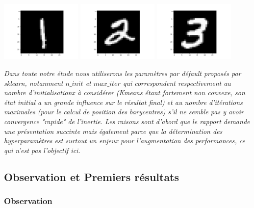 \documentclass{article}
\begin{document}
\begin{center}
  \includegraphics[width=0.3\textwidth]{"./Images/1.png"}
  \includegraphics[width=0.3\textwidth]{"./Images/2.png"}
  \includegraphics[width=0.3\textwidth]{"./Images/3.png"}
\end{center}



\textit{Dans toute notre étude nous utiliserons les paramètres par défault proposés par sklearn,  notamment $n\_init$ et $max\_iter$ qui correspondent respectivement au nombre d'initialisationx à considérer (Kmeans étant fortement non convexe, son état initial a un grande influence sur le résultat final) et au nombre d'itérations maximales (pour le calcul de position des barycentres) s'il ne semble pas y avoir convergence "rapide" de l'inertie. \newline Les raisons sont d'abord que le rapport demande une présentation succinte mais également parce que la détermination des hyperparamètres est surtout un enjeux pour l'augmentation des performances, ce qui n'est pas l'objectif ici.} 

\subsection{Observation et Premiers résultats}

\subsubsection{Observation}
\end{document}
